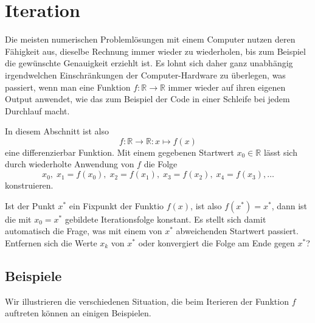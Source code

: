 %
%
%
\section{Iteration
\label{buch:section:iteration}}
Die meisten numerischen Problemlösungen mit einem Computer nutzen deren
Fähigkeit aus, dieselbe Rechnung immer wieder zu wiederholen, bis zum
Beispiel die gewünschte Genauigkeit erziehlt ist.
Es lohnt sich daher ganz unabhängig irgendwelchen Einschränkungen 
der Computer-Hardware zu überlegen, was passiert, wenn man eine
Funktion $f\colon \mathbb R\to\mathbb R$ immer wieder auf ihren eigenen
Output anwendet, wie das zum Beispiel der Code in einer Schleife
bei jedem Durchlauf macht.

In diesem Abschnitt ist also
\[
f\colon \mathbb{R}\to\mathbb{R} : x\mapsto f(x)
\]
eine differenzierbar Funktion.
Mit einem gegebenen Startwert $x_0\in\mathbb R$ lässt sich durch
wiederholte Anwendung von $f$ die Folge
\[
x_0,\; x_1 = f(x_0),\; x_2 = f(x_1),\; x_3 = f(x_2),\; x_4 = f(x_3),\dots
\]
konstruieren.

Ist der Punkt $x^*$ ein Fixpunkt der Funktio $f(x)$, ist also $f(x^*)=x^*$,
dann ist die mit $x_0=x^*$ gebildete Iterationsfolge konstant.
Es stellt sich damit automatisch die Frage, was mit einem von $x^*$
abweichenden Startwert passiert. Entfernen sich die Werte $x_k$ von $x^*$
oder konvergiert die Folge am Ende gegen $x^*$?

%
%
\subsection{Beispiele}
Wir illustrieren die verschiedenen Situation, die beim Iterieren der
Funktion $f$ auftreten können an einigen Beispielen.


